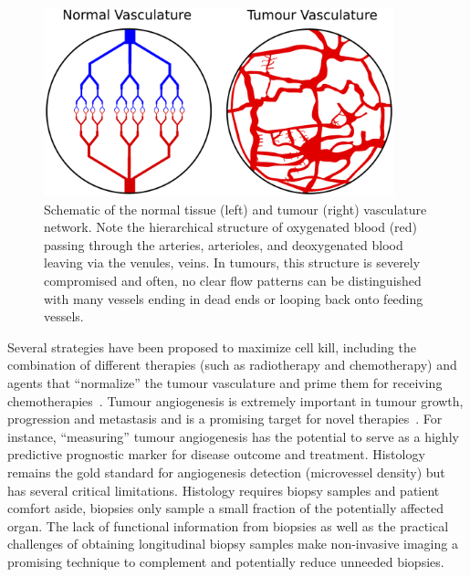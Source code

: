 \begin{figure}  
 \begin{center}  
 \includegraphics[width=4in]{intro/intro-images/tumourVasculature.pdf}
 \caption{Schematic of the normal tissue (left) and tumour (right) vasculature network. 
 Note the hierarchical structure of oxygenated blood (red) passing through the arteries, arterioles, and deoxygenated blood leaving via the venules, veins. 
 In tumours, this structure is severely compromised and often, no clear flow patterns can be distinguished with many vessels ending in dead ends or looping back onto feeding vessels.}
 \label{tumourVasculature}
 \end{center}
\end{figure}

Several strategies have been proposed to maximize cell kill, including the combination of different therapies (such as radiotherapy and chemotherapy) and agents that ``normalize'' the tumour vasculature and prime them for receiving chemotherapies~\cite{Jain:2005gk}.
Tumour angiogenesis is extremely important in tumour growth, progression and metastasis and is a promising target for novel therapies~\cite{Miles:2000wq}.
For instance, ``measuring'' tumour angiogenesis has the potential to serve as a highly predictive prognostic marker for disease outcome and treatment.
Histology remains the gold standard for angiogenesis detection (microvessel density) but has several critical limitations.
Histology requires biopsy samples and patient comfort aside, biopsies only sample a small fraction of the potentially affected organ.
The lack of functional information from biopsies as well as the practical challenges of obtaining longitudinal biopsy samples make non-invasive imaging a promising technique to complement and potentially reduce unneeded biopsies.

